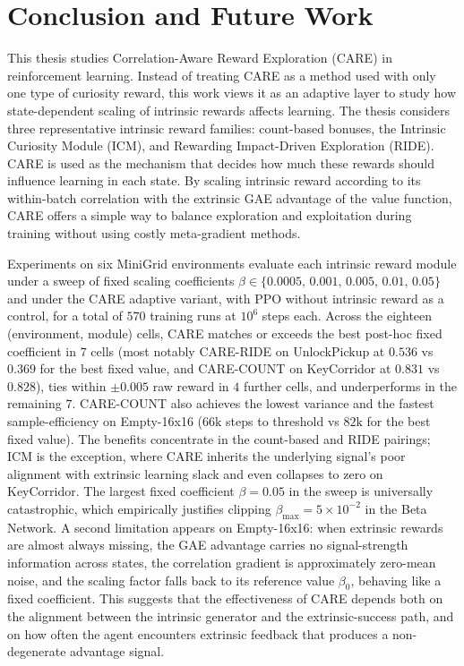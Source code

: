 \chapter*{Conclusion and Future Work}

This thesis studies Correlation-Aware Reward Exploration (CARE) in reinforcement learning. Instead of treating CARE as a method used with only one type of curiosity reward, this work views it as an adaptive layer to study how state-dependent scaling of intrinsic rewards affects learning. The thesis considers three representative intrinsic reward families: count-based bonuses, the Intrinsic Curiosity Module (ICM), and Rewarding Impact-Driven Exploration (RIDE). CARE is used as the mechanism that decides how much these rewards should influence learning in each state. By scaling intrinsic reward according to its within-batch correlation with the extrinsic GAE advantage of the value function, CARE offers a simple way to balance exploration and exploitation during training without using costly meta-gradient methods.

Experiments on six MiniGrid environments evaluate each intrinsic reward module under a sweep of fixed scaling coefficients $\beta \in \{0.0005,\, 0.001,\, 0.005,\, 0.01,\, 0.05\}$ and under the CARE adaptive variant, with PPO without intrinsic reward as a control, for a total of $570$ training runs at $10^6$ steps each. Across the eighteen (environment, module) cells, CARE matches or exceeds the best post-hoc fixed coefficient in $7$ cells (most notably CARE-RIDE on UnlockPickup at $0.536$ vs $0.369$ for the best fixed value, and CARE-COUNT on KeyCorridor at $0.831$ vs $0.828$), ties within $\pm 0.005$ raw reward in $4$ further cells, and underperforms in the remaining $7$. CARE-COUNT also achieves the lowest variance and the fastest sample-efficiency on Empty-16x16 ($66\text{k}$ steps to threshold vs $82\text{k}$ for the best fixed value). The benefits concentrate in the count-based and RIDE pairings; ICM is the exception, where CARE inherits the underlying signal's poor alignment with extrinsic learning slack and even collapses to zero on KeyCorridor. The largest fixed coefficient $\beta = 0.05$ in the sweep is universally catastrophic, which empirically justifies clipping $\beta_\text{max} = 5 \times 10^{-2}$ in the Beta Network. A second limitation appears on Empty-16x16: when extrinsic rewards are almost always missing, the GAE advantage carries no signal-strength information across states, the correlation gradient is approximately zero-mean noise, and the scaling factor falls back to its reference value $\beta_0$, behaving like a fixed coefficient. This suggests that the effectiveness of CARE depends both on the alignment between the intrinsic generator and the extrinsic-success path, and on how often the agent encounters extrinsic feedback that produces a non-degenerate advantage signal.

